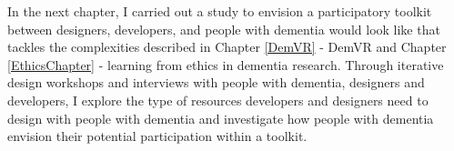 In the next chapter, I carried out a study to envision a participatory toolkit between designers, developers, and people with dementia would look like that tackles the complexities described in Chapter \ref{DemVR} - DemVR and Chapter \ref{EthicsChapter} - learning from ethics in dementia research. Through iterative design workshops and interviews with people with dementia, designers and developers, I explore the type of resources developers and designers need to design with people with dementia and investigate how people with dementia envision their potential participation within a toolkit. 